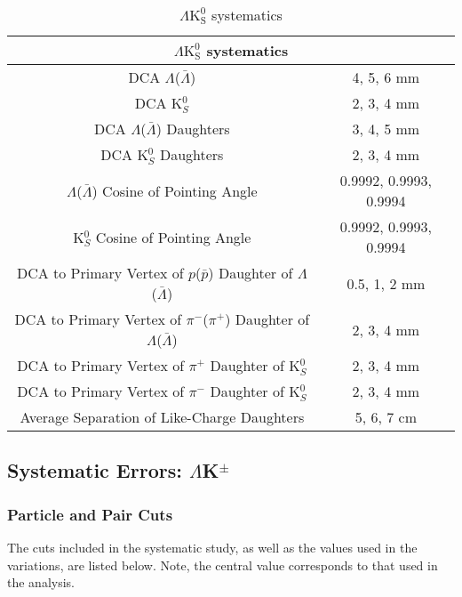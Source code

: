 \documentclass[ALICE,manyauthors]{cernphprep}
\newcommand{\LamKs}{$\Lambda\mathrm{K^{0}_{S}}$\xspace}
\begin{document}
\begin{table}[htbp]
 \centering 
  \renewcommand{\arraystretch}{1.2}
  \begin{tabular}{c|c}
   \multicolumn{2}{c}{\LamKs systematics} \\
   \hline  
   DCA $\Lambda$($\bar{\Lambda}$) & 4, 5, 6 mm \\
   \hline
   DCA K$^{0}_{S}$ & 2, 3, 4 mm \\
   \hline
   DCA $\Lambda$($\bar{\Lambda}$) Daughters & 3, 4, 5 mm \\
   \hline
   DCA K$^{0}_{S}$ Daughters & 2, 3, 4 mm \\
   \hline
   $\Lambda$($\bar{\Lambda}$) Cosine of Pointing Angle & 0.9992, 0.9993, 0.9994 \\
   \hline
   K$^{0}_{S}$ Cosine of Pointing Angle & 0.9992, 0.9993, 0.9994 \\
   \hline
   DCA to Primary Vertex of $p$($\bar{p}$) Daughter of $\Lambda$($\bar{\Lambda}$) & 0.5, 1, 2 mm \\
   \hline
   DCA to Primary Vertex of $\pi^{-}$($\pi^{+}$) Daughter of $\Lambda$($\bar{\Lambda}$) &  2, 3, 4 mm \\ 
   \hline
   DCA to Primary Vertex of $\pi^{+}$ Daughter of K$^{0}_{S}$ & 2, 3, 4 mm \\
   \hline
   DCA to Primary Vertex of $\pi^{-}$ Daughter of K$^{0}_{S}$ & 2, 3, 4 mm \\
   \hline
   Average Separation of Like-Charge Daughters & 5, 6, 7 cm \\
   \hline
  \end{tabular}
 \caption{\LamKs systematics}
 \label{tab:LamK0sSystematics} 
\end{table}


\subsection{Systematic Errors: \texorpdfstring{$\Lambda$K$^{\pm}$}{TEXT}}
\label{SysErrsLamKch}

\subsubsection{Particle and Pair Cuts}
\label{SysErrsLamKch:ParticleAndPairCuts}

The cuts included in the systematic study, as well as the values used in the variations, are listed below.  Note, the central value corresponds to that used in the analysis.
\end{document}
